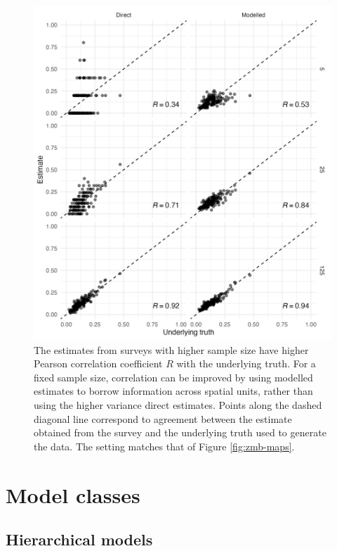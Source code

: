 \documentclass[a4paper, nobind]{templates/ociamthesis}
\begin{document}
\begin{figure}

{\centering \includegraphics[width=0.95\linewidth]{figures/bayesian/zmb-scatter} 

}

\caption{The estimates from surveys with higher sample size have higher Pearson correlation coefficient \(R\) with the underlying truth. For a fixed sample size, correlation can be improved by using modelled estimates to borrow information across spatial units, rather than using the higher variance direct estimates. Points along the dashed diagonal line correspond to agreement between the estimate obtained from the survey and the underlying truth used to generate the data. The setting matches that of Figure \ref{fig:zmb-maps}.}\label{fig:zmb-scatter}
\end{figure}

\hypertarget{hierarchical-lgm-elgm}{%
\section{Model classes}\label{hierarchical-lgm-elgm}}

\hypertarget{hierarchical}{%
\subsection{Hierarchical models}\label{hierarchical}}
\end{document}
